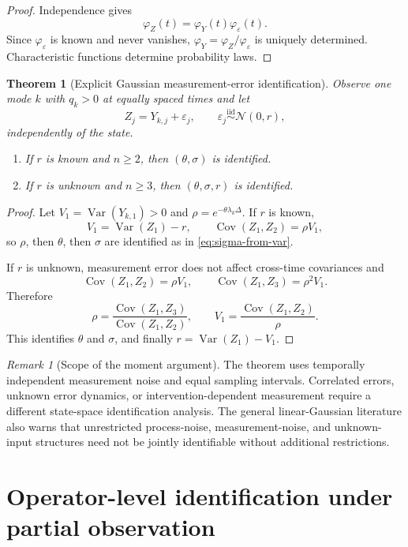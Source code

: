 \documentclass[11pt]{article}
\newtheorem{theorem}[assumption]{Theorem}
\theoremstyle{remark}
\newtheorem{remark}[assumption]{Remark}
\newcommand{\Cov}{\operatorname{Cov}}
\newcommand{\Var}{\operatorname{Var}}
\newcommand{\1}{\mathbf 1}
\begin{document}
\begin{proof}
Independence gives
\[
 \varphi_Z(t)=\varphi_Y(t)\varphi_\varepsilon(t).
\]
Since $\varphi_\varepsilon$ is known and never vanishes,
$\varphi_Y=\varphi_Z/\varphi_\varepsilon$ is uniquely determined.  Characteristic functions determine probability laws.
\end{proof}

\begin{theorem}[Explicit Gaussian measurement-error identification]\label{thm:noisy-gaussian}
Observe one mode $k$ with $q_k>0$ at equally spaced times and let
\[
 Z_j=Y_{k,j}+\varepsilon_j,
 \qquad
 \varepsilon_j\overset{\mathrm{iid}}{\sim}\mathcal N(0,r),
\]
independently of the state.

\begin{enumerate}[label=\textup{(\roman*)},leftmargin=2.6em]
\item If $r$ is known and $n\ge2$, then $(\theta,\sigma)$ is identified.
\item If $r$ is unknown and $n\ge3$, then $(\theta,\sigma,r)$ is identified.
\end{enumerate}
\end{theorem}

\begin{proof}
Let $V_1=\Var(Y_{k,1})>0$ and $\rho=e^{-\theta\lambda_k\Delta}$.
If $r$ is known,
\[
 V_1=\Var(Z_1)-r,
 \qquad
 \Cov(Z_1,Z_2)=\rho V_1,
\]
so $\rho$, then $\theta$, then $\sigma$ are identified as in \eqref{eq:sigma-from-var}.

If $r$ is unknown, measurement error does not affect cross-time covariances and
\[
 \Cov(Z_1,Z_2)=\rho V_1,
 \qquad
 \Cov(Z_1,Z_3)=\rho^2V_1.
\]
Therefore
\[
 \rho=
 \frac{\Cov(Z_1,Z_3)}{\Cov(Z_1,Z_2)},
 \qquad
 V_1=\frac{\Cov(Z_1,Z_2)}{\rho}.
\]
This identifies $\theta$ and $\sigma$, and finally
$r=\Var(Z_1)-V_1$.
\end{proof}

\begin{remark}[Scope of the moment argument]
The theorem uses temporally independent measurement noise and equal sampling intervals.  Correlated errors, unknown error dynamics, or intervention-dependent measurement require a different state-space identification analysis.  The general linear-Gaussian literature also warns that unrestricted process-noise, measurement-noise, and unknown-input structures need not be jointly identifiable without additional restrictions.
\end{remark}

\section{Operator-level identification under partial observation}\label{sec:operator}
\end{document}
